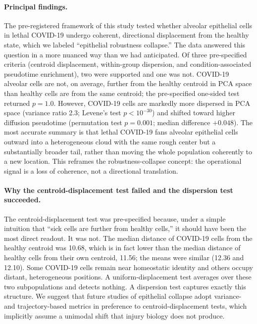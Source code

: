 \documentclass[11pt]{article}
\begin{document}
\paragraph{Principal findings.} The pre-registered framework of this study tested whether alveolar epithelial cells in lethal COVID-19 undergo coherent, directional displacement from the healthy state, which we labeled ``epithelial robustness collapse.'' The data answered this question in a more nuanced way than we had anticipated. Of three pre-specified criteria (centroid displacement, within-group dispersion, and condition-associated pseudotime enrichment), two were supported and one was not. COVID-19 alveolar cells are not, on average, further from the healthy centroid in PCA space than healthy cells are from the same centroid; the pre-specified one-sided test returned $p = 1.0$. However, COVID-19 cells are markedly more dispersed in PCA space (variance ratio 2.3; Levene's test $p < 10^{-30}$) and shifted toward higher diffusion pseudotime (permutation test $p = 0.001$; median difference $+0.048$). The most accurate summary is that lethal COVID-19 fans alveolar epithelial cells outward into a heterogeneous cloud with the same rough center but a substantially broader tail, rather than moving the whole population coherently to a new location. This reframes the robustness-collapse concept: the operational signal is a loss of coherence, not a directional translation.

\paragraph{Why the centroid-displacement test failed and the dispersion test succeeded.} The centroid-displacement test was pre-specified because, under a simple intuition that ``sick cells are further from healthy cells,'' it should have been the most direct readout. It was not. The median distance of COVID-19 cells from the healthy centroid was 10.68, which is in fact lower than the median distance of healthy cells from their own centroid, 11.56; the means were similar (12.36 and 12.10). Some COVID-19 cells remain near homeostatic identity and others occupy distant, heterogeneous positions. A uniform-displacement test averages over these two subpopulations and detects nothing. A dispersion test captures exactly this structure. We suggest that future studies of epithelial collapse adopt variance- and trajectory-based metrics in preference to centroid-displacement tests, which implicitly assume a unimodal shift that injury biology does not produce.
\end{document}
